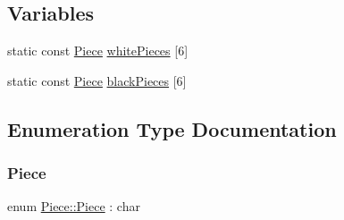\subsection*{Variables}
\begin{DoxyCompactItemize}
\item 
static const \hyperlink{namespacePiece_a588233307aa6bdb32c1d62c9f20895cc}{Piece} \hyperlink{namespacePiece_a8c9ba77d6f9a9bb67a5a5d8e95a9f945}{white\+Pieces} \mbox{[}6\mbox{]}
\item 
static const \hyperlink{namespacePiece_a588233307aa6bdb32c1d62c9f20895cc}{Piece} \hyperlink{namespacePiece_a531c90c92acec2708048ce3b9caddf2a}{black\+Pieces} \mbox{[}6\mbox{]}
\end{DoxyCompactItemize}


\subsection{Enumeration Type Documentation}
\mbox{\label{namespacePiece_a588233307aa6bdb32c1d62c9f20895cc}} 
\subsubsection{\texorpdfstring{Piece}{Piece}}
{\footnotesize\ttfamily enum \hyperlink{namespacePiece_a588233307aa6bdb32c1d62c9f20895cc}{Piece\+::\+Piece} \+: char}

